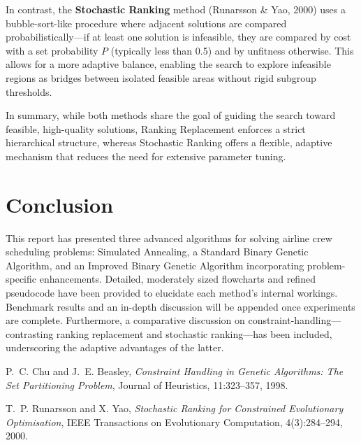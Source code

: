 \documentclass[12pt]{article}
\begin{document}
In contrast, the \textbf{Stochastic Ranking} method (Runarsson \& Yao, 2000) uses a bubble-sort-like procedure where adjacent solutions are compared probabilistically—if at least one solution is infeasible, they are compared by cost with a set probability \(P\) (typically less than 0.5) and by unfitness otherwise. This allows for a more adaptive balance, enabling the search to explore infeasible regions as bridges between isolated feasible areas without rigid subgroup thresholds.

In summary, while both methods share the goal of guiding the search toward feasible, high-quality solutions, Ranking Replacement enforces a strict hierarchical structure, whereas Stochastic Ranking offers a flexible, adaptive mechanism that reduces the need for extensive parameter tuning.
\section{Conclusion}
This report has presented three advanced algorithms for solving airline crew scheduling problems: Simulated Annealing, a Standard Binary Genetic Algorithm, and an Improved Binary Genetic Algorithm incorporating problem-specific enhancements. Detailed, moderately sized flowcharts and refined pseudocode have been provided to elucidate each method's internal workings. Benchmark results and an in-depth discussion will be appended once experiments are complete. Furthermore, a comparative discussion on constraint-handling—contrasting ranking replacement and stochastic ranking—has been included, underscoring the adaptive advantages of the latter.

\newpage

\begin{thebibliography}{9}
  P.~C. Chu and J.~E. Beasley, 
  \emph{Constraint Handling in Genetic Algorithms: The Set Partitioning Problem},
  Journal of Heuristics, 11:323--357, 1998.

  T.~P. Runarsson and X. Yao, 
  \emph{Stochastic Ranking for Constrained Evolutionary Optimisation},
  IEEE Transactions on Evolutionary Computation, 4(3):284--294, 2000.
\end{thebibliography}
\end{document}
